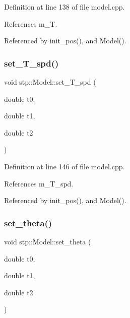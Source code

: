 Definition at line 138 of file model.\+cpp.



References m\+\_\+T.



Referenced by init\+\_\+pos(), and Model().

\mbox{\label{classstp_1_1_model_a84fd6646ed05db5eec86afd968fde65d}} 
\subsubsection{\texorpdfstring{set\+\_\+\+T\+\_\+spd()}{set\_T\_spd()}}
{\footnotesize\ttfamily void stp\+::\+Model\+::set\+\_\+\+T\+\_\+spd (\begin{DoxyParamCaption}\item[{double}]{t0,  }\item[{double}]{t1,  }\item[{double}]{t2 }\end{DoxyParamCaption})\hspace{0.3cm}{\ttfamily [protected]}}



Definition at line 146 of file model.\+cpp.



References m\+\_\+\+T\+\_\+spd.



Referenced by init\+\_\+pos(), and Model().

\mbox{\label{classstp_1_1_model_a6a6dcae980e86d84084dc4ccd0de3285}} 
\subsubsection{\texorpdfstring{set\+\_\+theta()}{set\_theta()}}
{\footnotesize\ttfamily void stp\+::\+Model\+::set\+\_\+theta (\begin{DoxyParamCaption}\item[{double}]{t0,  }\item[{double}]{t1,  }\item[{double}]{t2 }\end{DoxyParamCaption})\hspace{0.3cm}{\ttfamily [protected]}}



